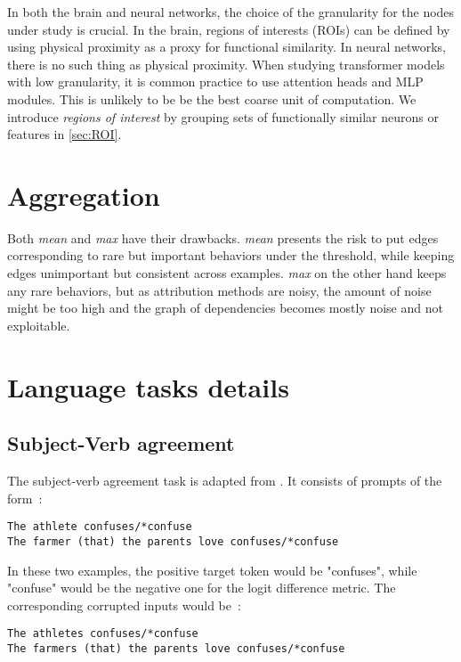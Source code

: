 \documentclass{article}
\begin{document}
In both the brain and neural networks, the choice of the granularity for the nodes under study is crucial. In the brain, regions of interests (ROIs) can be defined by using physical proximity as a proxy for functional similarity. In neural networks, there is no such thing as physical proximity. When studying transformer models with low granularity, it is common practice to use attention heads and MLP modules. This is unlikely to be be the best coarse unit of computation. We introduce \textit{regions of interest} by grouping sets of functionally similar neurons or features in \cref{sec:ROI}.\\

\section{Aggregation}
\label{app:aggregation}

Both \emph{mean} and \emph{max} have their drawbacks. \emph{mean} presents the risk to put edges corresponding to rare but important behaviors under the threshold, while keeping edges unimportant but consistent across examples. \emph{max} on the other hand keeps any rare behaviors, but as attribution methods are noisy, the amount of noise might be too high and the graph of dependencies becomes mostly noise and not exploitable.

\section{Language tasks details}
\label{app:tasks}

\subsection{Subject-Verb agreement}
\label{app:RC}

The subject-verb agreement task is adapted from \citet{finlayson-etal-2021-causal}. It consists of prompts of the form~:

{\small
\begin{verbatim}
The athlete confuses/*confuse
The farmer (that) the parents love confuses/*confuse
\end{verbatim}
}

In these two examples, the positive target token would be "confuses", while "confuse" would be the negative one for the logit difference metric. The corresponding corrupted inputs would be~:
{\small
\begin{verbatim}
The athletes confuses/*confuse
The farmers (that) the parents love confuses/*confuse
\end{verbatim}
}
\end{document}
